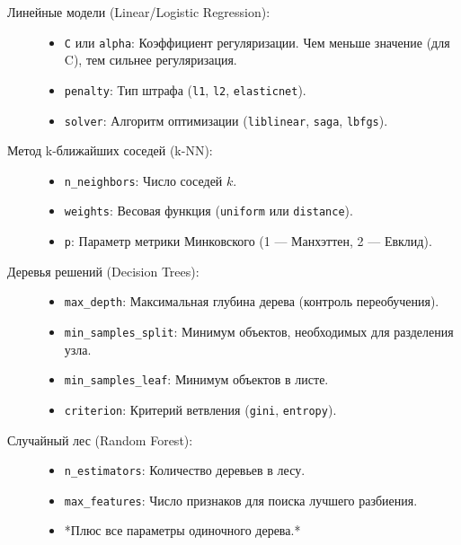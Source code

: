 \documentclass[12pt]{article}
\begin{document}
\begin{description}
    \item[Линейные модели (Linear/Logistic Regression):]
    \begin{itemize}
        \item \texttt{C} или \texttt{alpha}: Коэффициент регуляризации. Чем меньше значение (для C), тем сильнее регуляризация.
        \item \texttt{penalty}: Тип штрафа (\texttt{l1}, \texttt{l2}, \texttt{elasticnet}).
        \item \texttt{solver}: Алгоритм оптимизации (\texttt{liblinear}, \texttt{saga}, \texttt{lbfgs}).
    \end{itemize}

    \item[Метод k-ближайших соседей (k-NN):]
    \begin{itemize}
        \item \texttt{n\_neighbors}: Число соседей $k$.
        \item \texttt{weights}: Весовая функция (\texttt{uniform} или \texttt{distance}).
        \item \texttt{p}: Параметр метрики Минковского (1 — Манхэттен, 2 — Евклид).
    \end{itemize}

    \item[Деревья решений (Decision Trees):]
    \begin{itemize}
        \item \texttt{max\_depth}: Максимальная глубина дерева (контроль переобучения).
        \item \texttt{min\_samples\_split}: Минимум объектов, необходимых для разделения узла.
        \item \texttt{min\_samples\_leaf}: Минимум объектов в листе.
        \item \texttt{criterion}: Критерий ветвления (\texttt{gini}, \texttt{entropy}).
    \end{itemize}

    \item[Случайный лес (Random Forest):]
    \begin{itemize}
        \item \texttt{n\_estimators}: Количество деревьев в лесу.
        \item \texttt{max\_features}: Число признаков для поиска лучшего разбиения.
        \item *Плюс все параметры одиночного дерева.*
    \end{itemize}


\end{description}
\end{document}

